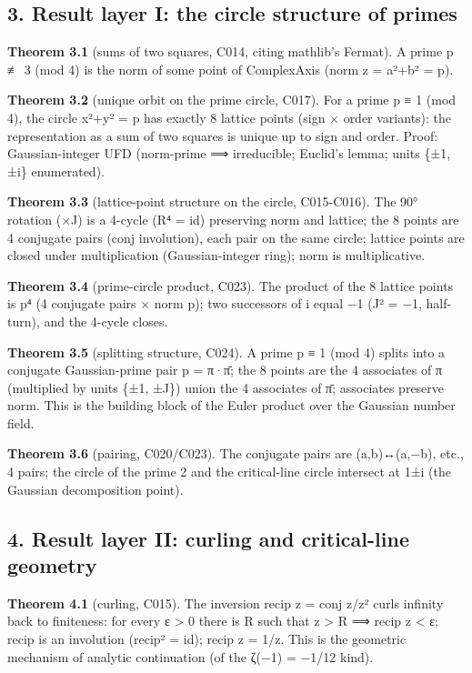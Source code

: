 \documentclass[
]{article}
\begin{document}
\subsection{3. Result layer I: the circle structure of
primes}\label{result-layer-i-the-circle-structure-of-primes}

\textbf{Theorem 3.1} (sums of two squares, C014, citing mathlib's
Fermat). A prime p ≢ 3 (mod 4) is the norm of some point of ComplexAxis
(norm z = a²+b² = p).

\textbf{Theorem 3.2} (unique orbit on the prime circle, C017). For a
prime p ≡ 1 (mod 4), the circle x²+y² = p has exactly 8 lattice points
(sign × order variants): the representation as a sum of two squares is
unique up to sign and order. Proof: Gaussian-integer UFD (norm-prime ⟹
irreducible; Euclid's lemma; units \{±1, ±i\} enumerated).

\textbf{Theorem 3.3} (lattice-point structure on the circle, C015-C016).
The 90° rotation (×J) is a 4-cycle (R⁴ = id) preserving norm and
lattice; the 8 points are 4 conjugate pairs (conj involution), each pair
on the same circle; lattice points are closed under multiplication
(Gaussian-integer ring); norm is multiplicative.

\textbf{Theorem 3.4} (prime-circle product, C023). The product of the 8
lattice points is p⁴ (4 conjugate pairs × norm p); two successors of i
equal −1 (J² = −1, half-turn), and the 4-cycle closes.

\textbf{Theorem 3.5} (splitting structure, C024). A prime p ≡ 1 (mod 4)
splits into a conjugate Gaussian-prime pair p = π·π̄; the 8 points are
the 4 associates of π (multiplied by units \{±1, ±J\}) union the 4
associates of π̄; associates preserve norm. This is the building block of
the Euler product over the Gaussian number field.

\textbf{Theorem 3.6} (pairing, C020/C023). The conjugate pairs are
(a,b)↔(a,−b), etc., 4 pairs; the circle of the prime 2 and the
critical-line circle intersect at 1±i (the Gaussian decomposition
point).

\subsection{4. Result layer II: curling and critical-line
geometry}\label{result-layer-ii-curling-and-critical-line-geometry}

\textbf{Theorem 4.1} (curling, C015). The inversion recip z = conj
z/\textbar z\textbar² curls infinity back to finiteness: for every ε
\textgreater{} 0 there is R such that \textbar z\textbar{}
\textgreater{} R ⟹ \textbar recip z\textbar{} \textless{} ε; recip is an
involution (recip² = id); \textbar recip z\textbar{} =
1/\textbar z\textbar. This is the geometric mechanism of analytic
continuation (of the ζ(−1) = −1/12 kind).
\end{document}
